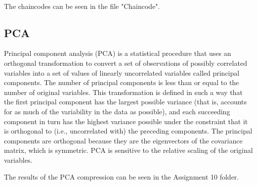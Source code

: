 \begin{figure*}[h!]
    \centering
 ~
\end{figure*}

The chaincodes can be seen in the file "Chaincode".

\subsection{PCA} 
Principal component analysis (PCA) is a statistical procedure that uses an orthogonal transformation to convert a set of observations of possibly correlated variables into a set of values of linearly uncorrelated variables called principal components. The number of principal components is less than or equal to the number of original variables. This transformation is defined in such a way that the first principal component has the largest possible variance (that is, accounts for as much of the variability in the data as possible), and each succeeding component in turn has the highest variance possible under the constraint that it is orthogonal to (i.e., uncorrelated with) the preceding components. The principal components are orthogonal because they are the eigenvectors of the covariance matrix, which is symmetric. PCA is sensitive to the relative scaling of the original variables.

The results of the PCA compression can be seen in the Assignment 10 folder.

